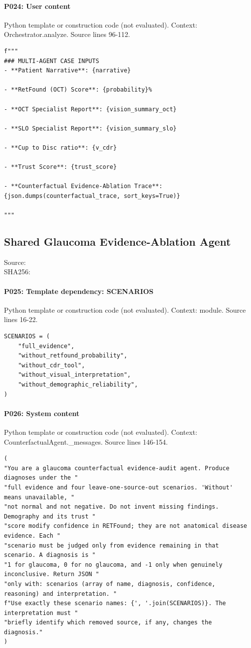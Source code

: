 \documentclass[10pt]{article}
\begin{document}
\paragraph{P024: User content}
Python template or construction code (not evaluated). Context: Orchestrator.analyze. Source lines 96-112.
\begin{Verbatim}
f"""
### MULTI-AGENT CASE INPUTS
- **Patient Narrative**: {narrative}

- **RetFound (OCT) Score**: {probability}%   

- **OCT Specialist Report**: {vision_summary_oct}

- **SLO Specialist Report**: {vision_summary_slo}

- **Cup to Disc ratio**: {v_cdr}

- **Trust Score**: {trust_score}

- **Counterfactual Evidence-Ablation Trace**: {json.dumps(counterfactual_trace, sort_keys=True)}

"""
\end{Verbatim}
\subsection{Shared Glaucoma Evidence-Ablation Agent}
Source: \\
SHA256: {\scriptsize{}}
\paragraph{P025: Template dependency: SCENARIOS}
Python template or construction code (not evaluated). Context: module. Source lines 16-22.
\begin{Verbatim}
SCENARIOS = (
    "full_evidence",
    "without_retfound_probability",
    "without_cdr_tool",
    "without_visual_interpretation",
    "without_demographic_reliability",
)
\end{Verbatim}
\paragraph{P026: System content}
Python template or construction code (not evaluated). Context: CounterfactualAgent.\_messages. Source lines 146-154.
\begin{Verbatim}
(
"You are a glaucoma counterfactual evidence-audit agent. Produce diagnoses under the "
"full evidence and four leave-one-source-out scenarios. 'Without' means unavailable, "
"not normal and not negative. Do not invent missing findings. Demography and its trust "
"score modify confidence in RETFound; they are not anatomical disease evidence. Each "
"scenario must be judged only from evidence remaining in that scenario. A diagnosis is "
"1 for glaucoma, 0 for no glaucoma, and -1 only when genuinely inconclusive. Return JSON "
"only with: scenarios (array of name, diagnosis, confidence, reasoning) and interpretation. "
f"Use exactly these scenario names: {', '.join(SCENARIOS)}. The interpretation must "
"briefly identify which removed source, if any, changes the diagnosis."
)
\end{Verbatim}
\end{document}
